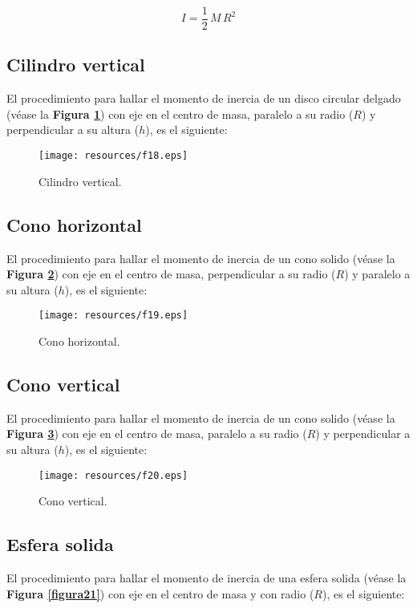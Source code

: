 \documentclass[letter,oneside,11pt]{article}
\begin{document}
\begin{equation}
    I = \frac{1}{2}\, M\, R^2
\end{equation}

\subsection{Cilindro vertical}
El procedimiento para hallar el momento de inercia de un disco circular delgado
(véase la \textbf{Figura \ref{figura18}}) con eje en el centro de masa,
paralelo a su radio ($R$) y perpendicular a su altura ($h$), es el siguiente:

\begin{figure}
\centering
\texttt{[image: resources/f18.eps]}
\caption{Cilindro vertical.}
\label{figura18}
\end{figure}

\subsection{Cono horizontal}
El procedimiento para hallar el momento de inercia de un cono solido
(véase la \textbf{Figura \ref{figura19}}) con eje en el centro de masa,
perpendicular a su radio ($R$) y paralelo a su altura ($h$), es el siguiente:
 
\begin{figure}
\centering
\texttt{[image: resources/f19.eps]}
\caption{Cono horizontal.}
\label{figura19}
\end{figure}

\subsection{Cono vertical}
El procedimiento para hallar el momento de inercia de un cono solido
(véase la \textbf{Figura \ref{figura20}}) con eje en el centro de masa,
paralelo a su radio ($R$) y perpendicular a su altura ($h$), es el siguiente:

\begin{figure}
\centering
\texttt{[image: resources/f20.eps]}
\caption{Cono vertical.}
\label{figura20}
\end{figure}

\subsection{Esfera solida}
El procedimiento para hallar el momento de inercia de una esfera solida
(véase la \textbf{Figura \ref{figura21}}) con eje en el centro de masa y con
radio ($R$), es el siguiente:
\end{document}
